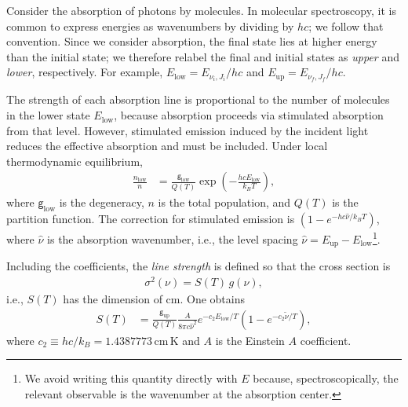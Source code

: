 Consider the absorption of photons by molecules. In molecular spectroscopy, it is common to express energies as wavenumbers by dividing by $hc$; we follow that convention. Since we consider absorption, the final state lies at higher energy than the initial state; we therefore relabel the final and initial states as \textit{upper} and \textit{lower}, respectively. For example, $E_\mathrm{low} = E_{\nu_i, J_i}/hc$ and $E_\mathrm{up} = E_{\nu_f, J_f}/hc$.

The strength of each absorption line is proportional to the number of molecules in the lower state $E_\mathrm{low}$, because absorption proceeds via stimulated absorption from that level. However, stimulated emission induced by the incident light reduces the effective absorption and must be included. Under local thermodynamic equilibrium,
\begin{align}
\label{eq:lte}
\frac{n_\mathrm{low}}{n} &= \frac{\mathsf{g}_\mathrm{low}}{Q(T)}
\exp\!\left(- \frac{h c E_\mathrm{low}}{k_B T} \right),
\end{align}
where $\mathsf{g}_\mathrm{low}$ is the degeneracy, $n$ is the total population, and $Q(T)$ is the partition function. The correction for stimulated emission is $(1- e^{-h c \hat{\nu}/k_B T})$, where $\hat{\nu}$ is the absorption wavenumber, i.e., the level spacing $\hat{\nu} = E_\mathrm{up} - E_\mathrm{low}$\footnote{We avoid writing this quantity directly with $E$ because, spectroscopically, the relevant observable is the wavenumber at the absorption center.}.

Including the coefficients, the \emph{line strength} is defined so that the cross section is
\begin{align}
\sigma^2 (\nu) = S(T)\, g(\nu),
\end{align}
i.e., $S(T)$ has the dimension of $\mathrm{cm}$. One obtains
\begin{align}
\label{eq:STexomol}
S(T) &= \frac{\mathsf{g}_\mathrm{up}}{Q(T)} \frac{ A}{8 \pi c \hat{\nu}^2}
e^{-  c_2 E_\mathrm{low}/T} \left(1- e^{-c_2 \tilde{\nu}/T}\right),
\end{align}
where $c_2 \equiv hc/k_B = 1.4387773 \, \mathrm{cm\,K}$ and $A$ is the Einstein $A$ coefficient.

